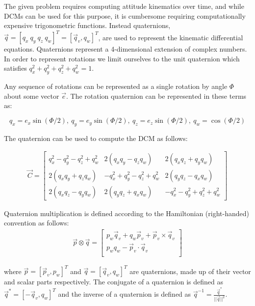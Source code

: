 The given problem requires computing attitude kinematics over time, and while DCMs can be used for this purpose, it is cumbersome requiring computationally expensive trigonometric functions. Instead quaternions, $\vec{q} = [q_{x} \ q_{y} \ q_{z} \ q_{w}]^T = [\vec{q}_v, q_w]^T$, are used to represent the kinematic differential equations. Quaternions represent a 4-dimensional extension of complex numbers. In order to represent rotations we limit ourselves to the unit quaternion which satisfies $q_{x}^2 + q_{y}^2 + q_{z}^2 + q_{w}^2 = 1$.

Any sequence of rotations can be represented as a single rotation by angle $\Phi$ about some vector $\vec{e}$. The rotation quaternion can be represented in these terms as:

$$
    q_{x}=e_{x}\sin(\Phi/2), \
    q_{y}=e_{y}\sin(\Phi/2), \
    q_{z}=e_{z}\sin(\Phi/2), \
    q_{w}=\cos(\Phi/2)
$$

The quaternion can be used to compute the DCM as follows:

\begin{align}
    \vec{C} = \begin{bmatrix}
        q_{x}^2 -q_{y}^2 - q_{z}^2 + q_{w}^2 & 2(q_{x}q_{y} - q_{z}q_{w}) & 2(q_{x}q_{z} + q_{y}q_{w}) \\
        2(q_{x}q_{y} + q_{z}q_{w}) & -q_{x}^2 + q_{y}^2 - q_{z}^2 + q_{w}^2 & 2(q_{y}q_{z} - q_{x}q_{w}) \\
        2(q_{x}q_{z} - q_{y}q_{w}) & 2(q_{y}q_{z} + q_{x}q_{w}) & -q_{x}^2 - q_{y}^2 + q_{z}^2 + q_{w}^2
    \end{bmatrix}
\end{align}

Quaternion multiplication is defined according to the Hamiltonian (right-handed) convention as follows:
\begin{align}
    \vec{p} \otimes \vec{q} = \begin{bmatrix}
        p_w \vec{q}_v + q_w \vec{p}_v + \vec{p}_v \times \vec{q}_v \\
        p_w q_w - \vec{p}_v \cdot \vec{q}_v \\
    \end{bmatrix}
\end{align}

where $\vec{p} = [\vec{p}_v, p_w]^T$ and $\vec{q} = [\vec{q}_v, q_w]^T$ are quaternions, made up of their vector and scalar parts respectively. The conjugate of a quaternion is defined as $\vec{q}^* = [-\vec{q}_v, q_w]^T$ and the inverse of a quaternion is defined as $\vec{q}^{-1} = \frac{\vec{q}^*}{||\vec{q}||^2}$.

